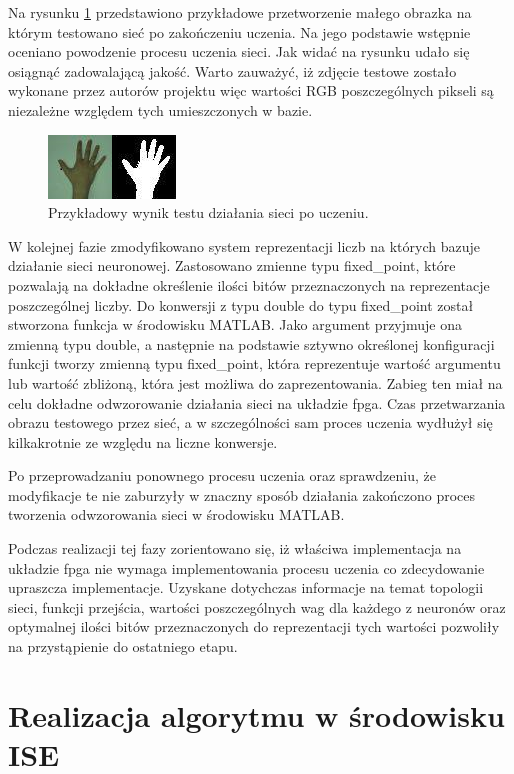 Na rysunku \ref{fig:reka} przedstawiono przykładowe przetworzenie małego obrazka na którym testowano sieć po zakończeniu uczenia. Na jego podstawie wstępnie oceniano powodzenie procesu uczenia sieci. Jak widać na rysunku udało się osiągnąć zadowalającą jakość. Warto zauważyć, iż zdjęcie testowe zostało wykonane przez autorów projektu więc wartości RGB poszczególnych pikseli są niezależne względem tych umieszczonych w bazie.

\begin{figure}[tbph!]
	\centering
	\includegraphics[width=0.6\linewidth]{images/reka.png}
	\caption{Przykładowy wynik testu działania sieci po uczeniu.}
	\label{fig:reka}
\end{figure}

W kolejnej fazie zmodyfikowano system reprezentacji liczb na których bazuje działanie sieci neuronowej. Zastosowano zmienne typu fixed\_point, które pozwalają na dokładne określenie ilości bitów przeznaczonych na reprezentacje poszczególnej liczby. Do konwersji z typu double do typu fixed\_point został stworzona funkcja w środowisku MATLAB. Jako argument przyjmuje ona zmienną typu double, a następnie na podstawie sztywno określonej konfiguracji funkcji tworzy zmienną typu fixed\_point, która reprezentuje wartość argumentu lub wartość zbliżoną, która jest możliwa do zaprezentowania. Zabieg ten miał na celu dokładne odwzorowanie działania sieci na układzie fpga. Czas przetwarzania obrazu testowego przez sieć, a w szczególności sam proces uczenia wydłużył się kilkakrotnie ze względu na liczne konwersje.

Po przeprowadzaniu ponownego procesu uczenia oraz sprawdzeniu, że modyfikacje te nie zaburzyły w znaczny sposób działania zakończono proces tworzenia odwzorowania sieci w środowisku MATLAB. 

Podczas realizacji tej fazy zorientowano się, iż właściwa implementacja na układzie fpga nie wymaga implementowania procesu uczenia co zdecydowanie upraszcza implementacje. Uzyskane dotychczas informacje na temat topologii sieci, funkcji przejścia, wartości poszczególnych wag dla każdego z neuronów oraz optymalnej ilości bitów przeznaczonych do reprezentacji tych wartości pozwoliły na przystąpienie do ostatniego etapu.

\section{Realizacja algorytmu w środowisku ISE}


